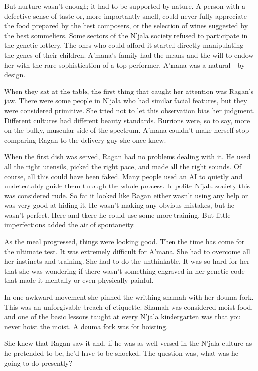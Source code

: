 \documentclass[12pt]{book}
\begin{document}
But nurture wasn't enough; it had to be supported by nature. A person with a defective sense of taste or, more importantly smell, could never fully appreciate the food prepared by the best composers, or the selection of wines suggested by the best sommeliers. Some sectors of the N'jala society refused to participate in the genetic lottery. The ones who could afford it started directly manipulating the genes of their children. A'mana's family had the means and the will to endow her with the rare sophistication of a top performer. A'mana was a natural---by design.

When they sat at the table, the first thing that caught her attention was Ragan's jaw. There were some people in N'jala who had similar facial features, but they were considered primitive. She tried not to let this observation bias her judgment. Different cultures had different beauty standards. Burrions were, so to say, more on the bulky, muscular side of the spectrum. A'mana couldn't make herself stop comparing Ragan to the delivery guy she once knew. 

When the first dish was served, Ragan had no problems dealing with it. He used all the right utensils, picked the right pace, and made all the right sounds. Of course, all this could have been faked. Many people used an AI to quietly and undetectably guide them through the whole process. In polite N'jala society this was considered rude. So far it looked like Ragan either wasn't using any help or was very good at hiding it. He wasn't making any obvious mistakes, but he wasn't perfect. Here and there he could use some more training. But little imperfections added the air of spontaneity.

As the meal progressed, things were looking good. Then the time has come for the ultimate test. It was extremely difficult for A'mana. She had to overcome all her instincts and training. She had to do the unthinkable. It was so hard for her that she was wondering if there wasn't something engraved in her genetic code that made it mentally or even physically painful. 

In one awkward movement she pinned the writhing shamah with her douma fork. This was an unforgivable breach of etiquette. Shamah was considered moist food, and one of the basic lessons taught at every N'jala kindergarten was that you never hoist the moist. A douma fork was for hoisting. 

She knew that Ragan saw it and, if he was as well versed in the N'jala culture as he pretended to be, he'd have to be shocked. The question was, what was he going to do presently?
\end{document}
